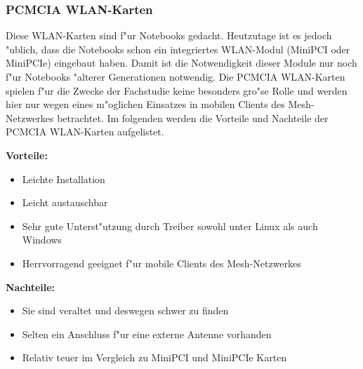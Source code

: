\newpage
\subsubsection{PCMCIA WLAN-Karten}

Diese WLAN-Karten sind f"ur Notebooks gedacht. Heutzutage ist es jedoch
"ublich, dass die Notebooks schon ein integriertes WLAN-Modul
(MiniPCI oder MiniPCIe) eingebaut haben. Damit ist die Notwendigkeit
dieser Module nur noch f"ur Notebooks "alterer Generationen notwendig.
Die PCMCIA WLAN-Karten spielen f"ur die Zwecke der Fachstudie keine
besonders gro"se Rolle und werden hier nur wegen eines m"oglichen
Einsatzes in mobilen Clients des Mesh-Netzwerkes betrachtet.
Im folgenden werden die Vorteile und Nachteile der PCMCIA WLAN-Karten
aufgelistet.

\textbf{Vorteile:}

\begin{itemize}
	\item Leichte Installation
	\item Leicht austauschbar
	\item Sehr gute Unterst"utzung durch Treiber sowohl unter Linux als
	auch Windows
	\item Herrvorragend geeignet f"ur mobile Clients des Mesh-Netzwerkes
\end{itemize}

\textbf{Nachteile:}

\begin{itemize}
	\item Sie sind veraltet und deswegen schwer zu finden
	\item Selten ein Anschluss f"ur eine externe Antenne vorhanden
	\item Relativ teuer im Vergleich zu MiniPCI und MiniPCIe Karten
\end{itemize}


